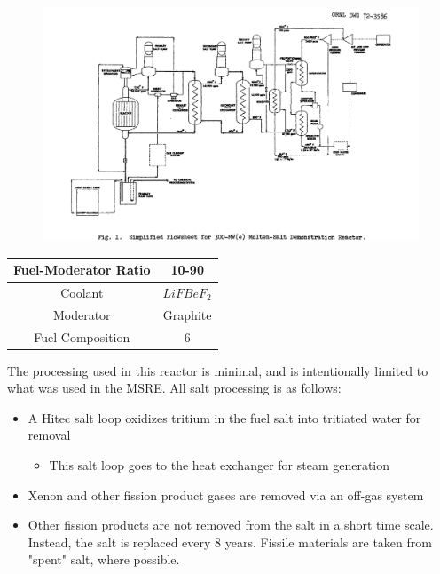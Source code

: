 \documentclass[letterpaper]{article}
\begin{document}
\begin{figure}[H]
  \centering
  \includegraphics[width=1.0\linewidth]{figures/MSDRsource2.png}
  \label{fig:fig6}
\end{figure}

\begin{center}
\begin{tabular}{|c|c|}
\hline
Fuel-Moderator Ratio & 10-90 \\
\hline
Coolant & $LiFBeF_2$ \\
\hline
Moderator & Graphite \\
\hline
Fuel Composition & 6 \\
\hline
\end{tabular}
\end{center}

The processing used in this reactor is minimal, and is intentionally limited to what was used in the MSRE.  All salt processing is as follows:

\begin{itemize}
\item A Hitec salt loop oxidizes tritium in the fuel salt into tritiated water for removal
	\begin{itemize}
	\item This salt loop goes to the heat exchanger for steam generation
	\end{itemize}
\item Xenon and other fission product gases are removed via an off-gas system
\item Other fission products are not removed from the salt in a short time scale.  Instead, the salt is replaced every 8 years.  Fissile materials are taken from "spent" salt, where possible.
\end{itemize}
\end{document}
